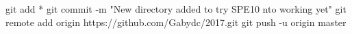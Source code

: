 git add *
git commit -m "New directory added to try SPE10 nto working yet"
git remote add origin https://github.com/Gabydc/2017.git
git push -u origin master
